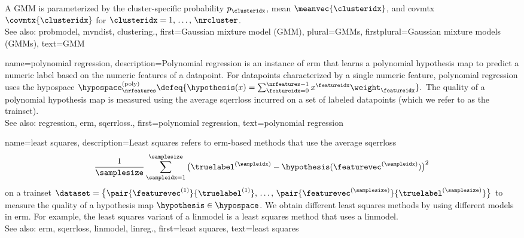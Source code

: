 {{				%
		A GMM is parameterized by the \gls{cluster}-specific \gls{probability}  
		$p_{\clusteridx}$, \gls{mean} $\meanvec{\clusteridx}$, and \gls{covmtx}  
		$\covmtx{\clusteridx}$ for $\clusteridx=1,\,\ldots,\,\nrcluster$.
		\\		
		See also: \gls{probmodel}, \gls{mvndist}, \gls{clustering}.},
	first={Gaussian mixture model (GMM)},
	plural={GMMs}, 
	firstplural={Gaussian mixture models (GMMs)}, 
	text={GMM} 
}
	
{name={polynomial regression}, 
	description={Polynomial 
		\gls{regression} is an instance of \gls{erm} that learns a polynomial \gls{hypothesis} 
		\gls{map} to predict a numeric \gls{label} based on the numeric \glspl{feature} of a \gls{datapoint}. 
		 For \glspl{datapoint} characterized by a single numeric \gls{feature}, polynomial \gls{regression} uses the \gls{hypospace} 
		$\hypospace^{(\rm poly)}_{\nrfeatures} \defeq \{ \hypothesis(x) = \sum_{\featureidx=0}^{\nrfeatures-1} x^{\featureidx} \weight_{\featureidx} \}.$
		The quality of a polynomial \gls{hypothesis} \gls{map} is measured using the average \gls{sqerrloss} 
		incurred on a set of \glspl{labeled datapoint} (which we refer to as the \gls{trainset}).
					\\
		See also: \gls{regression}, \gls{erm}, \gls{sqerrloss}.},
	first={polynomial regression},
	text={polynomial regression}
}

{name={least squares},
	description={Least squares refers to \gls{erm}-based 
        		methods that use the average \gls{sqerrloss} 
		$$ \frac{1}{\samplesize} \sum_{\sampleidx=1}^{\samplesize} \big( \truelabel^{(\sampleidx)} 
		- \hypothesis(\featurevec^{(\sampleidx)}) \big)^{2} $$   
		on a \gls{trainset} $\dataset = \big\{ \pair{\featurevec^{(1)}}{\truelabel^{(1)}}, \,\ldots, \,
		\pair{\featurevec^{(\samplesize)}}{\truelabel^{(\samplesize)}} \big\}$	
		to measure the quality of a \gls{hypothesis} \gls{map} $\hypothesis \in \hypospace$. 
		We obtain different least squares methods by using different \glspl{model} 
		in \gls{erm}. For example, the least squares variant of a \gls{linmodel} 
		is a least squares method that uses a \gls{linmodel}.
			   \\
		See also: \gls{erm}, \gls{sqerrloss}, \gls{linmodel}, \gls{linreg}.},
	first={least squares},
	text={least squares}
}

